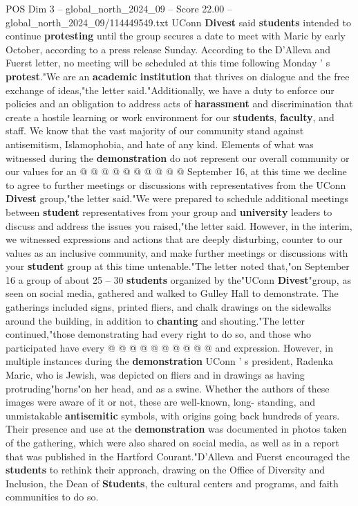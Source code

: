 \begin{textsample}{POS Dim 3 – global\_north\_2024\_09 – Score 22.00 – global\_north\_2024\_09/114449549.txt}
UConn \textbf{Divest} said \textbf{students} intended to continue \textbf{protesting} until the group secures a date to meet with Maric by early October, according to a press release Sunday.
According to the D'Alleva and Fuerst letter, no meeting will be scheduled at this time following Monday ' s \textbf{protest}."We are an \textbf{academic} \textbf{institution} that thrives on dialogue and the free exchange of ideas,"the letter said."Additionally, we have a duty to enforce our policies and an obligation to address acts of \textbf{harassment} and discrimination that create a hostile learning or work environment for our \textbf{students}, \textbf{faculty}, and staff.
We know that the vast majority of our community stand against antisemitism, Islamophobia, and hate of any kind.
Elements of what was witnessed during the \textbf{demonstration} do not represent our overall community or our values for an @ @ @ @ @ @ @ @ @ @ September 16, at this time we decline to agree to further meetings or discussions with representatives from the UConn \textbf{Divest} group,"the letter said."We were prepared to schedule additional meetings between \textbf{student} representatives from your group and \textbf{university} leaders to discuss and address the issues you raised,"the letter said.
However, in the interim, we witnessed expressions and actions that are deeply disturbing, counter to our values as an inclusive community, and make further meetings or discussions with your \textbf{student} group at this time untenable."The letter noted that,"on September 16 a group of about 25 -- 30 \textbf{students} organized by the"UConn \textbf{Divest}"group, as seen on social media, gathered and walked to Gulley Hall to demonstrate.
The gatherings included signs, printed fliers, and chalk drawings on the sidewalks around the building, in addition to \textbf{chanting} and shouting."The letter continued,"those demonstrating had every right to do so, and those who participated have every @ @ @ @ @ @ @ @ @ @ and expression.
However, in multiple instances during the \textbf{demonstration} UConn ' s president, Radenka Maric, who is Jewish, was depicted on fliers and in drawings as having protruding"horns"on her head, and as a swine.
Whether the authors of these images were aware of it or not, these are well-known, long- standing, and unmistakable \textbf{antisemitic} symbols, with origins going back hundreds of years.
Their presence and use at the \textbf{demonstration} was documented in photos taken of the gathering, which were also shared on social media, as well as in a report that was published in the Hartford Courant."D'Alleva and Fuerst encouraged the \textbf{students} to rethink their approach, drawing on the Office of Diversity and Inclusion, the Dean of \textbf{Students}, the cultural centers and programs, and faith communities to do so.

\end{textsample}
